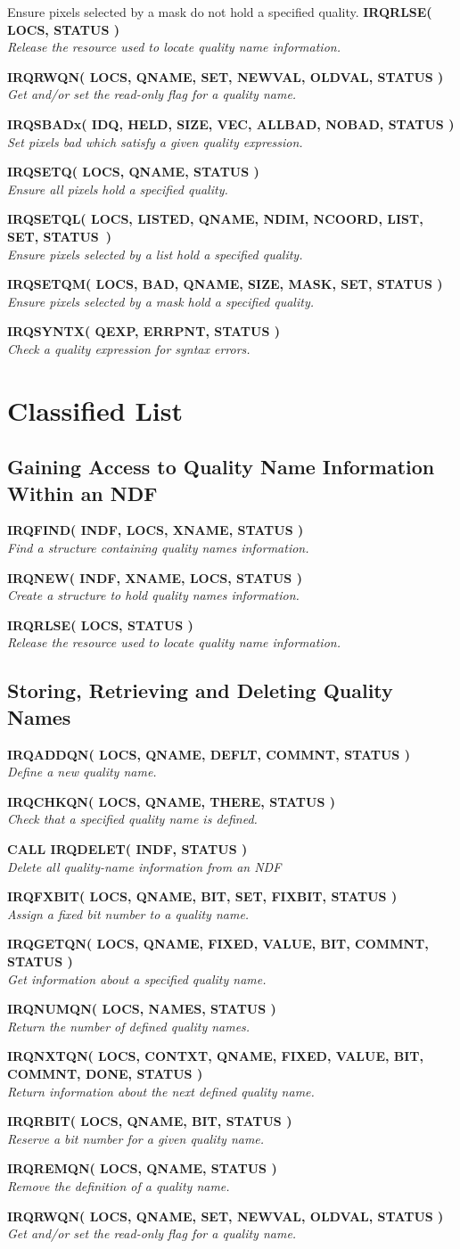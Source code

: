 \documentclass[twoside,11pt]{article}
\newcommand{\noteroutine}[2]{\textbf{#1}\hspace*{\fill}\nopagebreak \\
                             \hspace*{3em}\emph{#2}\hspace*{\fill}\par}
\renewcommand{\_}{\texttt{\symbol{95}}}
\begin{document}
   {Ensure pixels selected by a mask do not hold a specified quality.}
\noteroutine{IRQ\_RLSE( LOCS, STATUS )}
   {Release the resource used to locate quality name information.}
\noteroutine{IRQ\_RWQN( LOCS, QNAME, SET, NEWVAL, OLDVAL, STATUS )}
   {Get and/or set the read-only flag for a quality name.}
\noteroutine{IRQ\_SBADx( IDQ, HELD, SIZE, VEC, ALLBAD, NOBAD, STATUS )}
   {Set pixels bad which satisfy a given quality expression.}
\noteroutine{IRQ\_SETQ( LOCS, QNAME, STATUS )}
   {Ensure all pixels hold a specified quality.}
\noteroutine{IRQ\_SETQL( LOCS, LISTED, QNAME, NDIM, NCOORD, LIST, SET,
STATUS~)}
   {Ensure pixels selected by a list hold a specified quality.}
\noteroutine{IRQ\_SETQM( LOCS, BAD, QNAME, SIZE, MASK, SET, STATUS )}
   {Ensure pixels selected by a mask hold a specified quality.}
\noteroutine{IRQ\_SYNTX( QEXP, ERRPNT, STATUS )}
   {Check a quality expression for syntax errors.}

\newpage
\section {Classified List}

\subsection{Gaining Access to Quality Name Information Within an NDF}
\noteroutine{IRQ\_FIND( INDF, LOCS, XNAME, STATUS )}
   {Find a structure containing quality names information.}
\noteroutine{IRQ\_NEW( INDF, XNAME, LOCS, STATUS )}
   {Create a structure to hold quality names information.}
\noteroutine{IRQ\_RLSE( LOCS, STATUS )}
   {Release the resource used to locate quality name information.}

\subsection{Storing, Retrieving and Deleting Quality Names}
\noteroutine{IRQ\_ADDQN( LOCS, QNAME, DEFLT, COMMNT, STATUS )}
   {Define a new quality name.}
\noteroutine{IRQ\_CHKQN( LOCS, QNAME, THERE, STATUS )}
   {Check that a specified quality name is defined.}
\noteroutine{CALL IRQ\_DELET( INDF, STATUS )}
   {Delete all quality-name information from an NDF}
\noteroutine{IRQ\_FXBIT( LOCS, QNAME, BIT, SET, FIXBIT, STATUS )}
   {Assign a fixed bit number to a quality name.}
\noteroutine{IRQ\_GETQN( LOCS, QNAME, FIXED, VALUE, BIT, COMMNT, STATUS )}
   {Get information about a specified quality name.}
\noteroutine{IRQ\_NUMQN( LOCS, NAMES, STATUS )}
   {Return the number of defined quality names.}
\noteroutine{IRQ\_NXTQN( LOCS, CONTXT, QNAME, FIXED, VALUE, BIT, COMMNT, DONE, STATUS )}
   {Return information about the next defined quality name.}
\noteroutine{IRQ\_RBIT( LOCS, QNAME, BIT, STATUS )}
   {Reserve a bit number for a given quality name.}
\noteroutine{IRQ\_REMQN( LOCS, QNAME, STATUS )}
   {Remove the definition of a quality name.}
\noteroutine{IRQ\_RWQN( LOCS, QNAME, SET, NEWVAL, OLDVAL, STATUS )}
   {Get and/or set the read-only flag for a quality name.}
\end{document}
